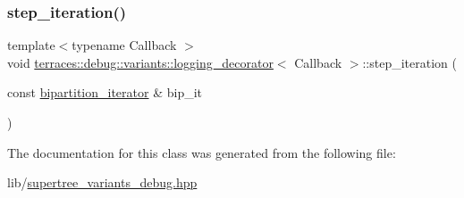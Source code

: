 \mbox{\label{classterraces_1_1debug_1_1variants_1_1logging__decorator_abf7256cde9b9aada061a80c8dd7a011f}} 
\subsubsection{\texorpdfstring{step\+\_\+iteration()}{step\_iteration()}}
{\footnotesize\ttfamily template$<$typename Callback $>$ \\
void \hyperlink{classterraces_1_1debug_1_1variants_1_1logging__decorator}{terraces\+::debug\+::variants\+::logging\+\_\+decorator}$<$ Callback $>$\+::step\+\_\+iteration (\begin{DoxyParamCaption}\item[{const \hyperlink{classterraces_1_1bipartition__iterator}{bipartition\+\_\+iterator} \&}]{bip\+\_\+it }\end{DoxyParamCaption})\hspace{0.3cm}{\ttfamily [inline]}}



The documentation for this class was generated from the following file\+:\begin{DoxyCompactItemize}
\item 
lib/\hyperlink{supertree__variants__debug_8hpp}{supertree\+\_\+variants\+\_\+debug.\+hpp}\end{DoxyCompactItemize}
